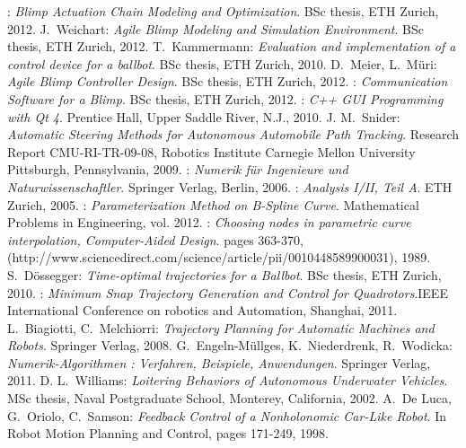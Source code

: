 \begin{thebibliography}{99}



:
{\it Blimp Actuation Chain Modeling and Optimization}. BSc thesis, ETH Zurich, 2012.
 {\sc J.~Weichart}:
{\it Agile Blimp Modeling and Simulation Environment}. BSc thesis, ETH Zurich, 2012.
 {\sc T.~Kammermann}:
{\it Evaluation and implementation of a control device for a ballbot}. BSc thesis, ETH Zurich, 2010.
 {\sc D.~Meier, L.~M{\"u}ri}:
{\it Agile Blimp Controller Design}. BSc thesis, ETH Zurich, 2012.
:
{\it Communication Software for a Blimp}. BSc thesis, ETH Zurich, 2012.
:
{\it C++ GUI Programming with Qt 4}. Prentice Hall, Upper Saddle River, N.J., 2010.
 {\sc J. M.~Snider}:
{\it Automatic Steering Methods for Autonomous Automobile Path Tracking}. Research Report CMU-RI-TR-09-08, Robotics Institute Carnegie Mellon University Pittsburgh, Pennsylvania, 2009.
:
{\it Numerik f{\"u}r Ingenieure und Naturwissenschaftler}. Springer Verlag, Berlin, 2006.
:
{\it Analysis I/II, Teil A}. ETH Zurich, 2005.
:
{\it Parameterization Method on B-Spline Curve}. Mathematical Problems in Engineering, vol. 2012.
:
{\it Choosing nodes in parametric curve interpolation, Computer-Aided Design}. pages 363-370, (http://www.sciencedirect.com/science/article\-/pii/0010448589900031), 1989.
 {\sc S.~D{\"o}ssegger}:
{\it Time-optimal trajectories for a Ballbot}. BSc thesis, ETH Zurich, 2010.
:
{\it Minimum Snap Trajectory Generation and Control for Quadrotors}.IEEE International Conference on robotics and Automation, Shanghai, 2011.
 {\sc L.~Biagiotti, C.~Melchiorri}:
{\it Trajectory Planning for Automatic Machines and Robots}. Springer Verlag, 2008.
 {\sc G.~Engeln-M{\"u}llges, K.~Niederdrenk, R.~Wodicka}:
{\it Numerik-Algorithmen : Verfahren, Beispiele, Anwendungen}. Springer Verlag, 2011.
 {\sc D. L.~Williams}:
{\it Loitering Behaviors of Autonomous Underwater Vehicles}. MSc thesis, Naval Postgraduate School, Monterey, California, 2002.
 {\sc A.~De Luca, G.~Oriolo, C.~Samson}:
{\it Feedback Control of a Nonholonomic Car-Like Robot}. In Robot Motion Planning and Control, pages 171-249, 1998.



\end{thebibliography}

